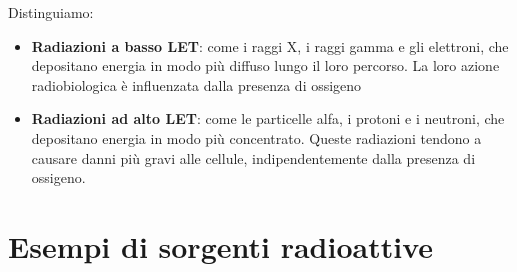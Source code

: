Distinguiamo:
\begin{itemize}
    \item \textbf{Radiazioni a basso LET}: come i raggi X, i raggi gamma e gli elettroni, che depositano energia in modo più diffuso lungo il loro percorso. La loro azione radiobiologica è influenzata dalla presenza di ossigeno
    \item \textbf{Radiazioni ad alto LET}: come le particelle alfa, i protoni e i neutroni, che depositano energia in modo più concentrato. Queste radiazioni tendono a causare danni più gravi alle cellule, indipendentemente dalla presenza di ossigeno.
\end{itemize}
\section{Esempi di sorgenti radioattive}
